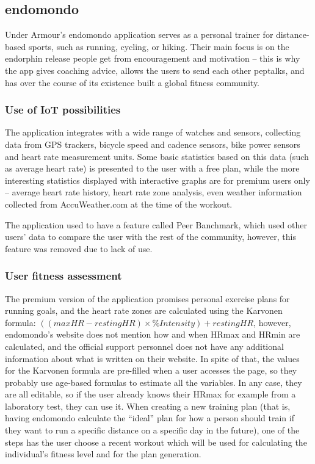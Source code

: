 \pagebreak
\subsection{endomondo}

Under Armour's endomondo application serves as a personal trainer for distance-based sports, such as running, cycling, or hiking.
Their main focus is on the endorphin release people get from encouragement and motivation -- this is why the app gives coaching advice, allows the users to send each other peptalks, and has over the course of its existence built a global fitness community.
\subsubsection*{Use of IoT possibilities}
The application integrates with a wide range of watches and sensors, collecting data from GPS trackers, bicycle speed and cadence sensors, bike power sensors and heart rate measurement units.
Some basic statistics based on this data (such as average heart rate) is presented to the user with a free plan, 
while the more interesting statistics displayed with interactive graphs are for premium users only -- average heart rate history, heart rate zone analysis, even weather information collected from AccuWeather.com at the time of the workout.

The application used to have a feature called Peer Banchmark, which used other users' data to compare the user with the rest of the community, however, this feature was removed due to lack of use.\cite{endomondo-HR-max-emails}
\subsubsection*{User fitness assessment}
The premium version of the application promises personal exercise plans for running goals, and the heart rate zones are calculated using the Karvonen formula: $((max HR − resting HR) × \% Intensity) + resting HR$,
however, endomondo's website does not mention how and when HRmax and HRmin are calculated, and the official support personnel does not have any additional information about what is written on their website.\cite{endomondo-HR-max-emails}
In spite of that, the values for the Karvonen formula are pre-filled when a user accesses the page, so they probably use age-based formulas to estimate all the variables.
In any case, they are all editable, so if the user already knows their HRmax for example from a laboratory test, they can use it.
When creating a new training plan (that is, having endomondo calculate the ``ideal'' plan for how a person should train if they want to run a specific distance on a specific day in the future),
one of the steps has the user choose a recent workout which will be used for calculating the individual's fitness level and for the plan generation.\cite{endomondo-training-plan-fitness-assessment}

